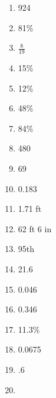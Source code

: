 \documentclass[../uilmath.tex]{subfiles}
\begin{document}
\begin{enumerate}[label=\bfseries\arabic*.]
    \item %
    924

    \item %
    81\%

    \item %
    $\frac{8}{19}$

    \item %
    15\%

    \item %
    12\%

    \item %
    48\%

    \item %
    84\%

    \item %
    480

    \item %
    69

    \item %
    0.183 

    \item %
    1.71 ft 

    \item %
    62 ft 6 in 

    \item %
    95th

    \item %
    21.6

    \item %
    0.046

    \item %
    0.346

    \item %
    11.3\%

    \item %
    0.0675

    \item %
    .6

    \item %
    
\end{enumerate}
\end{document}
